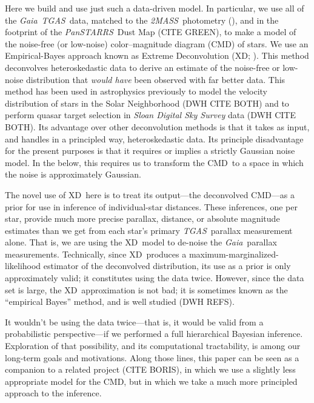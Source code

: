 \documentclass[modern]{aastex61}
\newcommand{\acronym}[1]{{\small{#1}}}
\newcommand{\project}[1]{\textsl{#1}}
\newcommand{\tgas}{\project{\acronym{TGAS}}}
\newcommand{\tmass}{\project{\acronym{2MASS}}}
\newcommand{\gaia}{\project{Gaia}}
\newcommand{\panstarrs}{\project{Pan\acronym{STARRS}}}
\newcommand{\xd}{\acronym{XD}}
\newcommand{\cmd}{\acronym{CMD}}
\begin{document}
Here we build and use just such a data-driven model.  In particular,
we use all of the \gaia\ \tgas\ data, matched to the
\tmass\ photometry (\citealt{skrutskie06}), and in the footprint of
the \panstarrs\ Dust Map (CITE GREEN), to make a model of the
noise-free (or low-noise) color--magnitude diagram (\cmd) of stars.
We use an Empirical-Bayes approach known as Extreme Deconvolution (XD;
\citealt{bovy11}).
This method deconvolves heteroskedastic data to derive an
estimate of the noise-free or low-noise distribution that \emph{would
  have} been observed with far better data.
This method has been used in astrophysics
previously to model the velocity distribution of stars in the Solar
Neighborhood (DWH CITE BOTH) and to perform quasar target selection
in \project{Sloan Digital Sky Survey} data (DWH CITE BOTH).
Its advantage over other deconvolution methods is that it takes as input,
and handles in a principled way, heteroskedastic data.
Its principle disadvantage for the present purposes is that it requires
or implies a strictly Gaussian noise model.
In the below, this requires us to transform the \cmd\ to a space in which
the noise is approximately Gaussian.

The novel use of \xd\ here is to treat its output---the deconvolved \cmd---as
a prior for use in inference of individual-star distances.
These inferences, one per star, provide much more precise parallax, distance,
or absolute magnitude estimates than we get from each star's primary
\tgas\ parallax measurement alone.
That is, we are using the \xd\ model to de-noise the \gaia\ parallax
measurements.
Technically, since \xd\ produces a maximum-marginalized-likelihood estimator
of the deconvolved distribution,
its use as a prior is only approximately valid; it constitutes using the
data twice.
However, since the data set is large, the \xd\ approximation is not bad; it is
sometimes known as the ``empirical Bayes'' method, and is well studied (DWH REFS).

It wouldn't be using the data twice---that is, it would be valid from a
probabilistic perspective---if we performed a full hierarchical Bayesian
inference.
Exploration of that possibility, and its computational tractability,
is among our long-term goals and motivations.
Along those lines, this paper can be seen as a companion to a related
project (CITE BORIS), in which we use a slightly less appropriate
model for the \cmd, but in which we take a much more principled
approach to the inference.
\end{document}
